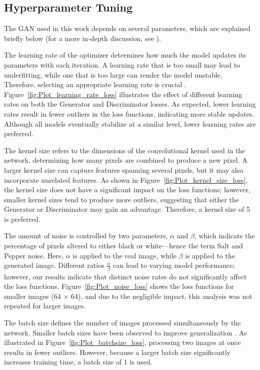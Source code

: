 \documentclass[fleqn,usenatbib,twocolumn]{mnras}
\begin{document}
\subsection{Hyperparameter Tuning}
The GAN used in this work depends on several parameters, which are explained briefly below (for a more in-depth discussion, see \cite{murphy2022probabilistic}).

The learning rate of the optimizer determines how much the model updates its parameters with each iteration. A learning rate that is too small may lead to underfitting, while one that is too large can render the model unstable. Therefore, selecting an appropriate learning rate is crucial \cite{murphy2022probabilistic}. Figure~\ref{fig:Plot_learning_rate_loss} illustrates the effect of different learning rates on both the Generator and Discriminator losses. As expected, lower learning rates result in fewer outliers in the loss functions, indicating more stable updates. Although all models eventually stabilize at a similar level, lower learning rates are preferred.

The kernel size refers to the dimensions of the convolutional kernel used in the network, determining how many pixels are combined to produce a new pixel. A larger kernel size can capture features spanning several pixels, but it may also incorporate unrelated features. As shown in Figure~\ref{fig:Plot_kernel_size_loss}, the kernel size does not have a significant impact on the loss functions; however, smaller kernel sizes tend to produce more outliers, suggesting that either the Generator or Discriminator may gain an advantage. Therefore, a kernel size of 5 is preferred.

The amount of noise is controlled by two parameters, \(\alpha\) and \(\beta\), which indicate the percentage of pixels altered to either black or white—hence the term Salt and Pepper noise. Here, \(\alpha\) is applied to the real image, while \(\beta\) is applied to the generated image. Different ratios \(\frac{\alpha}{\beta}\) can lead to varying model performance; however, our results indicate that distinct noise rates do not significantly affect the loss functions. Figure~\ref{fig:Plot_noise_loss} shows the loss functions for smaller images (64 × 64), and due to the negligible impact, this analysis was not repeated for larger images.

The batch size defines the number of images processed simultaneously by the network. Smaller batch sizes have been observed to improve generalization \cite{prince2023understanding}. As illustrated in Figure~\ref{fig:Plot_batchsize_loss}, processing two images at once results in fewer outliers. However, because a larger batch size significantly increases training time, a batch size of 1 is used.
\end{document}

